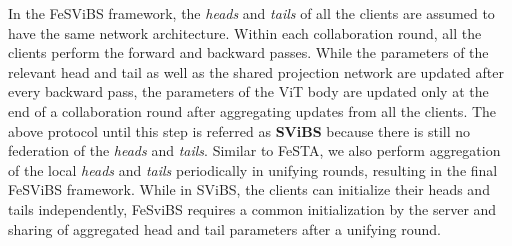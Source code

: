 \documentclass[runningheads]{llncs}
\begin{document}
In the FeSViBS framework, the \emph{heads} and \emph{tails} of all the clients are assumed to have the same network architecture. Within each collaboration round,  all the clients perform the forward and backward passes. While the parameters of the relevant head and tail as well as the shared projection network are updated after every backward pass, the parameters of the ViT body are updated only at the end of a collaboration round after aggregating updates from all the clients. The above protocol until this step is referred as \textbf{SViBS} because there is still no federation of the \emph{heads} and \emph{tails}. Similar to FeSTA, we also perform aggregation of the local \emph{heads} and \emph{tails} periodically in unifying rounds, resulting in the final FeSViBS framework. While in SViBS, the clients can initialize their heads and tails independently, FeSviBS requires a common initialization by the server and sharing of aggregated head and tail parameters after a unifying round.
\end{document}
